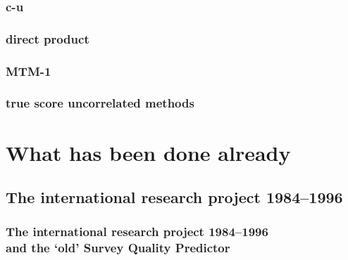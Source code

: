 \documentclass{beamer}
\begin{document}
\begin{frame}	
	\frametitle{c-u}
\end{frame}	
\begin{frame}	
	\frametitle{direct product}
\end{frame}	
\begin{frame}	
	\frametitle{MTM-1}
\end{frame}	
\begin{frame}	
	\frametitle{true score uncorrelated methods}
\end{frame}	

\section{What has been done already}

\subsection{The international research project 1984--1996}

\begin{frame}
 \frametitle{The international research project 1984--1996\\and the `old' Survey Quality Predictor}
\end{frame}
\end{document}
